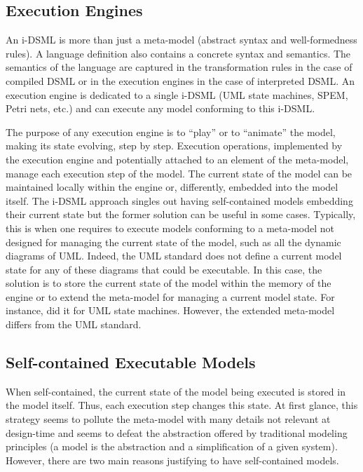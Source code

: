 \documentclass[english, 10pt]{llncs}
\begin{document}
\subsection{Execution Engines}

An i-DSML is more than just a meta-model (abstract syntax and
well-formedness rules). A language definition also contains a concrete
syntax and semantics. The semantics of the language are captured in
the transformation rules in the case of compiled DSML or in the
execution engines in the case of interpreted DSML. An execution engine
is dedicated to a single i-DSML (UML state machines, SPEM, Petri nets,
etc.) and can execute any model conforming to this i-DSML.

The purpose of any execution engine is to ``play'' or to ``animate''
the model, making its state evolving, step by step. Execution
operations, implemented by the execution engine and potentially
attached to an element of the meta-model, manage each execution step
of the model. The current state of the model can be maintained locally
within the engine or, differently, embedded into the model itself. The
i-DSML approach singles out having self-contained models embedding
their current state but the former solution can be useful in some
cases. Typically, this is when one requires to execute models
conforming to a meta-model not designed for managing the current state
of the model, such as all the dynamic diagrams of UML. Indeed, the UML
standard does not define a current model state for any of these
diagrams that could be executable. In this case, the solution is to
store the current state of the model within the memory of the engine
or to extend the meta-model for managing a current model state. For
instance, \cite{cariou-ecmfa11} did it for UML state
machines. However, the extended meta-model differs from the UML
standard.

\subsection{Self-contained Executable Models}

When self-contained, the current state of the model being executed is
stored in the model itself. Thus, each execution step changes this
state. At first glance, this strategy seems to pollute the meta-model
with many details not relevant at design-time and seems to defeat the
abstraction offered by traditional modeling principles (a model is
the abstraction and a simplification of a given system). However,
there are two main reasons justifying to have self-contained models.
\end{document}
